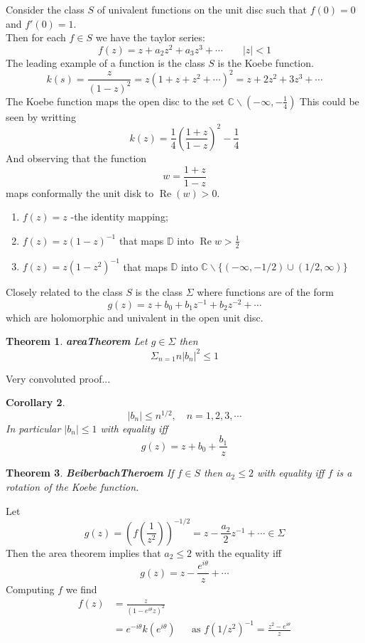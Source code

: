 \documentclass{article}
\newtheorem{theorem}{Theorem}[section]
\newtheorem{corollary}[theorem]{Corollary}
\newenvironment{proof}[1][Proof]{\begin{trivlist}
\item[\hskip \labelsep {\bfseries #1}]}{\end{trivlist}}
\newenvironment{example}[1][Example]{\begin{trivlist}
\item[\hskip \labelsep {\bfseries #1}]}{\end{trivlist}}
\newcommand{\C}{\mathbb{C}}
\newcommand{\Real}{\operatorname{Re}}
\begin{document}
Consider the class $S$ of univalent functions on the unit disc such that $f(0) = 0$ and $f'(0) = 1$.\\
Then for each $f \in S$ we have the taylor series:
\[ f(z) = z + a_2z^2 + a_3z^3 + \cdots \qquad |z| < 1\]
The leading example of a function is the class $S$ is the Koebe function.
\[ k(s) = \frac{z}{(1-z)^2} = z \left( 1 + z + z^2 +\cdots \right)^2 = z + 2z^2 + 3z^3 + \cdots \]
The Koebe function maps the open disc to the set $\C \backslash (-\infty, -\frac{1}{4})$
This could be seen by writting 
\[ k(z) = \frac{1}{4}\left(\frac{1+z}{1-z}\right)^2 - \frac{1}{4}\]
And observing that the function
\[ w = \frac{1+z}{1-z} \]
maps conformally the unit disk to $\Real(w) > 0$.

\begin{example}
    \begin{enumerate}
        \item $f(z) = z$ -the identity mapping;
        \item $f(z) = z(1-z)^{-1}$ that maps $\mathbb{D}$ into $\Real w > \frac{1}{2}$
        \item $f(z) = z(1-z^2)^{-1}$ that maps $\mathbb{D}$ into $\C \backslash \{(-\infty, -1/2) \cup (1/2, \infty)\}$
    \end{enumerate}
\end{example}
Closely related to the class $S$ is the class $\Sigma$ where functions are of the form
\[ g(z) = z + b_0 + b_1z^{-1} + b_2z^{-2} + \cdots\]
which are holomorphic and univalent in the open unit disc.

\begin{theorem} \label{areaTheorem} \textbf{areaTheorem}
    Let $g \in \Sigma$ then
    \[ \Sigma_{n = 1} n|b_n|^2 \leq 1 \]
\end{theorem}
Very convoluted proof...

\begin{corollary}
    \[ |b_n| \leq n^{1/2}, \quad n = 1,2,3,\cdots\]
    In particular $|b_n| \leq 1$ with equality iff
    \[ g(z) = z + b_0 +\frac{b_1}{z} \]
\end{corollary}

\begin{theorem} \label{BeiberbachTheroem} \textbf{BeiberbachTheroem}
    If $f \in S$ then $a_2 \leq 2$ with equality iff $f$ is a rotation of the Koebe function.
\end{theorem}
\begin{proof}
    Let
    \[ g(z) = \left(f\left(\frac{1}{z^2}\right)\right)^{-1/2} = z - \frac{a_2}{2}z^{-1} + \cdots \in \Sigma \]
    Then the area theorem implies that $a_2 \leq 2$ with the equality iff
    \[ g(z) = z - \frac{e^{i\theta}}{z} + \cdots \]
    Computing $f$ we find
    \begin{align*}
        f(z)
            &= \frac{z}{(1-e^{i\theta}z)^2}\\
            &= e^{-i\theta}k(e^{i\theta}) && \text{as } f(1/z^2)^{-1} = \frac{z^2 - e^{i\theta}}{z}
    \end{align*}
\end{proof}
\end{document}
